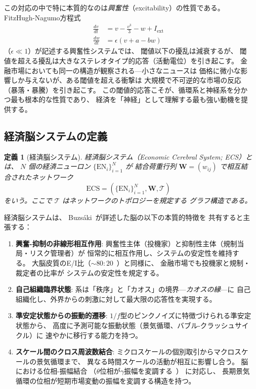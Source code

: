 \documentclass[12pt,twocolumn]{ltjsarticle}
\newtheorem{definition}{定義}
\newcommand{\EN}{\text{EN}}
\newcommand{\ECS}{\text{ECS}}
\begin{document}
この対応の中で特に本質的なのは\emph{興奮性}（excitability）の性質である。
FitzHugh-Nagumo方程式~\cite{FitzHugh1961}
\begin{align}
\frac{dv}{dt} &= v - \frac{v^3}{3} - w + I_{\text{ext}} \\
\frac{dw}{dt} &= \epsilon(v + a - bw)
\end{align}
（$\epsilon \ll 1$）が記述する興奮性システムでは、
閾値以下の擾乱は減衰するが、
閾値を超える擾乱は大きなステレオタイプ的応答（活動電位）を引き起こす。
金融市場においても同一の構造が観察される---小さなニュースは
価格に微小な影響しか与えないが、ある閾値を超える衝撃は
大規模で不可逆的な市場の反応（暴落・暴騰）を引き起こす。
この閾値的応答こそが、循環系と神経系を分かつ最も根本的な性質であり、
経済を「神経」として理解する最も強い動機を提供する。


\subsection{経済脳システムの定義}

\begin{definition}[経済脳システム]
\label{def:ecs}
経済脳システム（Economic Cerebral System; ECS）とは、
$N$ 個の経済ニューロン $\{ \EN_i \}_{i=1}^{N}$ が
結合荷重行列 $\mathbf{W} = (w_{ij})$ で相互結合されたネットワーク
\begin{equation}
\ECS = \left( \{ \EN_i \}_{i=1}^{N}, \mathbf{W}, \mathcal{T} \right)
\end{equation}
をいう。ここで $\mathcal{T}$ はネットワークのトポロジーを規定する
グラフ構造である。
\end{definition}

経済脳システムは、
Buzs\'{a}ki~\cite{Buzsaki2006}が詳述した脳の以下の本質的特徴を
共有すると主張する：

\begin{enumerate}
\item \textbf{興奮-抑制の非線形相互作用}:
興奮性主体（投機家）と抑制性主体（規制当局・リスク管理者）が
恒常的に相互作用し、システムの安定性を維持する。
大脳皮質のE/I比（$\sim 80:20$~\cite{Markram2004}）と同様に、
金融市場でも投機家と規制・裁定者の比率が
システムの安定性を規定する。

\item \textbf{自己組織臨界状態}:
系は「秩序」と「カオス」の境界---\emph{カオスの縁}---に
自己組織化し、外界からの刺激に対して最大限の応答性を実現する。

\item \textbf{準安定状態からの振動的遷移}:
$1/f$型のピンクノイズに特徴づけられる準安定状態から、
高度に予測可能な振動状態（景気循環、バブル-クラッシュサイクル）に
速やかに移行する能力を持つ。

\item \textbf{スケール間のクロス周波数結合}:
ミクロスケールの個別取引からマクロスケールの景気循環まで、
異なる時間スケールの活動が相互に影響し合う。
脳における位相-振幅結合
（$\theta$位相が$\gamma$振幅を変調する~\cite{Canolty2006}）
に対応し、
長期景気循環の位相が短期市場変動の振幅を変調する構造を持つ。
\end{enumerate}
\end{document}
